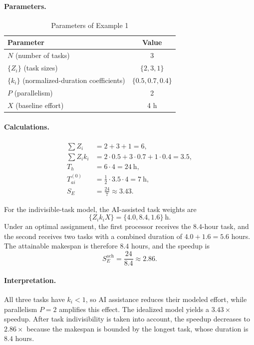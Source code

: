 \paragraph{Parameters.}
\begin{table}[ht!]
\centering
\caption{Parameters of Example 1}
\label{tab:example-1-params}
\begin{tabular}{lc}
\toprule
Parameter & Value \\
\midrule
$N$ (number of tasks) & 3 \\
$\{Z_i\}$ (task sizes) & $\{2, 3, 1\}$ \\
$\{k_i\}$ (normalized-duration coefficients) & $\{0.5, 0.7, 0.4\}$ \\
$P$ (parallelism) & 2 \\
$X$ (baseline effort) & 4 h \\
\bottomrule
\end{tabular}
\end{table}

\paragraph{Calculations.}
\begin{align*}
  \sum Z_i &= 2 + 3 + 1 = 6, \\
  \sum Z_i k_i &= 2{\cdot}0.5 + 3{\cdot}0.7 + 1{\cdot}0.4 = 3.5, \\
  T_h &= 6 \cdot 4 = 24~\text{h}, \\
  T_{ai}^{(0)} &= \frac{1}{2} \cdot 3.5 \cdot 4 = 7~\text{h}, \\
  S_E &= \frac{24}{7} \approx 3.43.
\end{align*}

For the indivisible-task model, the AI-assisted task weights are
\[
  \{Z_i k_i X\} = \{4.0, 8.4, 1.6\}~\text{h}.
\]
Under an optimal assignment, the first processor receives the $8.4$-hour task,
and the second receives two tasks with a combined duration of
$4.0 + 1.6 = 5.6$ hours. The attainable makespan is therefore $8.4$ hours, and
the speedup is
\[
  S_E^{\text{ach}} = \frac{24}{8.4} \approx 2.86.
\]

\paragraph{Interpretation.}
All three tasks have $k_i<1$, so AI assistance reduces their modeled effort,
while parallelism $P=2$ amplifies this effect. The idealized model yields a
$3.43\times$ speedup. After task indivisibility is taken into account, the
speedup decreases to $2.86\times$ because the makespan is bounded by the
longest task, whose duration is $8.4$ hours.

